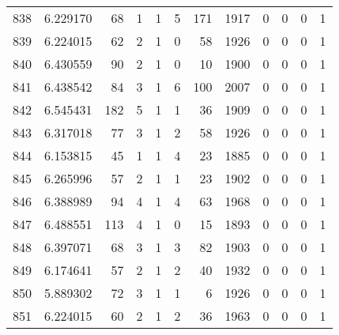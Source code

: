 \begin{tabular}{lrrrrrrrrrrr}
838 &  6.229170 &   68 &      1 &        1 &      5 &             171 &  1917 &               0 &               0 &               0 &               1 \\
839 &  6.224015 &   62 &      2 &        1 &      0 &              58 &  1926 &               0 &               0 &               0 &               1 \\
840 &  6.430559 &   90 &      2 &        1 &      0 &              10 &  1900 &               0 &               0 &               0 &               1 \\
841 &  6.438542 &   84 &      3 &        1 &      6 &             100 &  2007 &               0 &               0 &               0 &               1 \\
842 &  6.545431 &  182 &      5 &        1 &      1 &              36 &  1909 &               0 &               0 &               0 &               1 \\
843 &  6.317018 &   77 &      3 &        1 &      2 &              58 &  1926 &               0 &               0 &               0 &               1 \\
844 &  6.153815 &   45 &      1 &        1 &      4 &              23 &  1885 &               0 &               0 &               0 &               1 \\
845 &  6.265996 &   57 &      2 &        1 &      1 &              23 &  1902 &               0 &               0 &               0 &               1 \\
846 &  6.388989 &   94 &      4 &        1 &      4 &              63 &  1968 &               0 &               0 &               0 &               1 \\
847 &  6.488551 &  113 &      4 &        1 &      0 &              15 &  1893 &               0 &               0 &               0 &               1 \\
848 &  6.397071 &   68 &      3 &        1 &      3 &              82 &  1903 &               0 &               0 &               0 &               1 \\
849 &  6.174641 &   57 &      2 &        1 &      2 &              40 &  1932 &               0 &               0 &               0 &               1 \\
850 &  5.889302 &   72 &      3 &        1 &      1 &               6 &  1926 &               0 &               0 &               0 &               1 \\
851 &  6.224015 &   60 &      2 &        1 &      2 &              36 &  1963 &               0 &               0 &               0 &               1 \\

\end{tabular}
